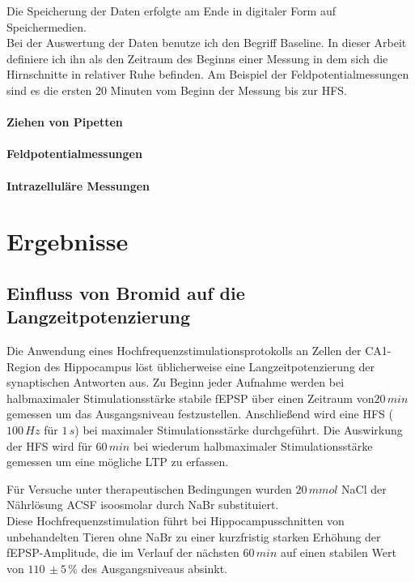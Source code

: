 \documentclass[a4paper,11pt]{report}
\begin{document}
{Die Speicherung der Daten erfolgte am Ende in digitaler Form auf Speichermedien.\\

Bei der Auswertung der Daten benutze ich den Begriff Baseline. In dieser Arbeit definiere ich ihn als den Zeitraum des Beginns einer Messung in dem sich die Hirnschnitte in relativer Ruhe befinden. Am Beispiel der Feldpotentialmessungen sind es die ersten 20 Minuten vom Beginn der Messung bis zur HFS. 

\subsubsection{Ziehen von Pipetten}

\subsubsection{Feldpotentialmessungen}

\subsubsection{Intrazelluläre Messungen}

\chapter{Ergebnisse}
\section{Einfluss von Bromid auf die Langzeitpotenzierung}
Die Anwendung eines Hochfrequenzstimulationsprotokolls an Zellen der CA1-Region des Hippocampus  löst üblicherweise eine Langzeitpotenzierung der synaptischen Antworten aus. Zu Beginn  jeder Aufnahme werden bei halbmaximaler Stimulationsstärke stabile fEPSP über einen Zeitraum von$20\, min$ gemessen um das Ausgangsniveau festzustellen. Anschließend wird eine HFS ($100\,Hz$ für $1\,s$) bei maximaler Stimulationsstärke durchgeführt. Die Auswirkung der HFS wird für $60\, min$ bei wiederum halbmaximaler Stimulationsstärke gemessen um eine mögliche LTP zu erfassen.

Für Versuche unter therapeutischen Bedingungen wurden  $20\, mmol$ NaCl der Nährlösung ACSF isoosmolar durch NaBr substituiert.\\

 Diese Hochfrequenzstimulation führt bei Hippocampusschnitten von unbehandelten Tieren ohne NaBr zu einer kurzfristig starken Erhöhung der fEPSP-Amplitude, die im Verlauf der nächsten $60\, min$ auf einen stabilen Wert von $110\,\pm 5\,\%$ des Ausgangsniveaus absinkt.

}
\end{document}
